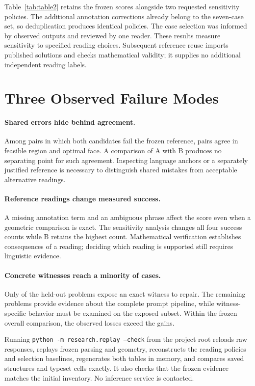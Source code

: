 \documentclass[letterpaper]{article}
\begin{document}
Table~\ref{tab:table2} retains the frozen scores alongside two requested sensitivity policies. The additional annotation corrections already belong to the seven-case set, so deduplication produces identical policies. The case selection was informed by observed outputs and reviewed by one reader. These results measure sensitivity to specified reading choices. Subsequent reference reuse imports published solutions and checks mathematical validity; it supplies no additional independent reading labels.

\section{Three Observed Failure Modes}
\paragraph{Shared errors hide behind agreement.}
Among \BothWrong{} pairs in which both candidates fail the frozen reference, \SharedWrong{} pairs agree in feasible region and optimal face. A comparison of A with B produces no separating point for such agreement. Inspecting language anchors or a separately justified reference is necessary to distinguish shared mistakes from acceptable alternative readings.

\paragraph{Reference readings change measured success.}
A missing annotation term and an ambiguous phrase affect the score even when a geometric comparison is exact. The sensitivity analysis changes all four success counts while B retains the highest count. Mathematical verification establishes consequences of a reading; deciding which reading is supported still requires linguistic evidence.

\paragraph{Concrete witnesses reach a minority of cases.}
Only \ExposureN{} of the \HeldoutN{} held-out problems expose an exact witness to repair. The remaining problems provide evidence about the complete prompt pipeline, while witness-specific behavior must be examined on the exposed subset. Within the frozen overall comparison, the observed losses exceed the gains.



Running \texttt{python -m research.replay --check} from the project root reloads raw responses, replays frozen parsing and geometry, reconstructs the reading policies and selection baselines, regenerates both tables in memory, and compares saved structures and typeset cells exactly. It also checks that the frozen evidence matches the initial inventory. No inference service is contacted.
\end{document}

